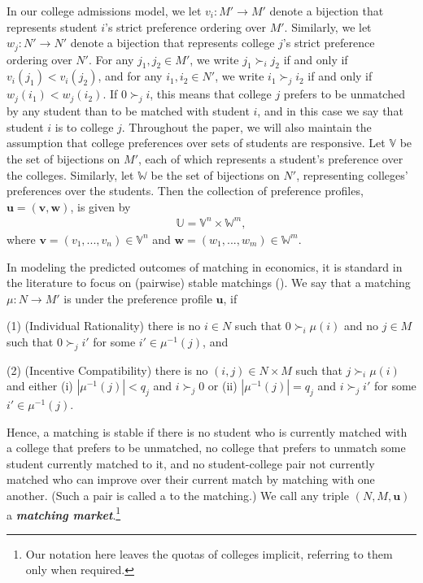 \documentclass[12pt, fullpage]{amsart}
\theoremstyle{definition}
\theoremstyle{definition}
\theoremstyle{definition}
\begin{document}
\begin{bibunit}[econometrica]
In our college admissions model, we let $v_i: M' \rightarrow M'$ denote a bijection that represents student $i$'s strict preference ordering over $M'$. Similarly, we let $w_j:N' \rightarrow N'$ denote a bijection that represents college $j$'s  strict preference ordering over $N'$. For any $j_1,j_2 \in M'$, we write $j_1 \succ_i j_2$ if and only if $v_i(j_1) < v_i(j_2)$, and for any $i_1,i_2 \in N'$, we write $i_1 \succ_j i_2$ if and only if $w_j(i_1) < w_j(i_2)$. If $0 \succ_j i$, this means that college $j$ prefers to be unmatched by any student than to be matched with student $i$, and in this case we say that student $i$ is  to college $j$. Throughout the paper, we will also maintain the assumption that college preferences over sets of students are responsive. Let $\mathbb{V}$ be the set of bijections on $M'$, each of which represents a student's preference over the colleges. Similarly, let $\mathbb{W}$ be the set of bijections on $N'$, representing colleges' preferences over the students. Then the collection of preference profiles, $\boldsymbol{u} = (\boldsymbol{v},\boldsymbol{w})$, is given by 
\begin{align*}
   \mathbb{U} = \mathbb{V}^n\times \mathbb{W}^m,
\end{align*}
where $\boldsymbol{v} = (v_1,...,v_n) \in\mathbb{V}^n$ and $\boldsymbol{w} = (w_1,...,w_m) \in\mathbb{W}^m$.

In modeling the predicted outcomes of matching in economics, it is standard in the literature to focus on (pairwise) stable matchings (\cite{Roth/Sotomayor:90:TwoSidedMatching}). We say that a matching $\mu: N \rightarrow M'$ is  under the preference profile $\boldsymbol{u}$, if\medskip

(1) (Individual Rationality) there is no $i\in N$ such that $0\succ_{i}\mu(i)$ and no $j \in M$ such that $0\succ_{j}i'$ for some $i'\in\mu^{-1}(j)$, and 

(2) (Incentive Compatibility) there is no $(i,j)\in N\times M$ such that  $j\succ_{i}\mu(i)$ and either (i) $|\mu^{-1}(j)|<q_{j}$ and $i \succ_{j}0$ or (ii) $|\mu^{-1}(j)|=q_{j}$ and $i\succ_{j}i'$ for some $i'\in\mu^{-1}(j)$. \medskip

Hence, a matching is stable if there is no  student who is currently matched with a college that prefers to be unmatched, no college that prefers to unmatch some student currently matched to it, and no student-college pair not currently matched who can improve over their current match by matching with one another. (Such a pair is called a  to the matching.) We call any triple $(N,M,\boldsymbol{u})$ a \textbf{\textit{matching market}}.\footnote{Our notation here leaves the quotas of colleges implicit, referring to them only when required.} 


\end{bibunit}
\end{document}
